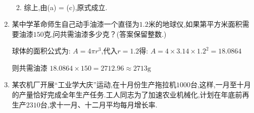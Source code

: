 \documentclass[answers]{exam}
\begin{document}
\begin{questions}
\begin{enumerate}[label=(\arabic*)]
\begin{solution}
\begin{enumerate}[label=\arabic*. ]
\begin{align*}
				            \end{align*}
				      \item 综上,由(a) = (c),原式成立.
			      \end{enumerate}
		      \end{solution}
		\item
		      某中学革命师生自己动手油漆一个直径为$1.2$米的地球仪,如果第平方米面积需要油漆$150$克,问共需油漆多少克？(答案保留整数.)
		      \begin{solution}
			      球体的面积公式为: \( A = 4\pi r^3 \),代入$r=1.2$得:
			      \begin{math}
				      A = 4\times 3.14 \times 1.2^2 = 18.0864
			      \end{math}

			      则共需油漆 \( 18.0864 \times 150 = 2712.96 \approx 2713 \text{g} \)
		      \end{solution}
		\item
		      某农机厂开展\enquote{工业学大庆}运动,在十月份生产拖拉机$1000$台,这样,一月至十月的产量恰好完成全年生产任务.工人同志为了加速农业机械化,计划在年底前再生产$2310$台,求十一月、十二月平均每月增长率.


\end{enumerate}
\end{questions}
\end{document}
